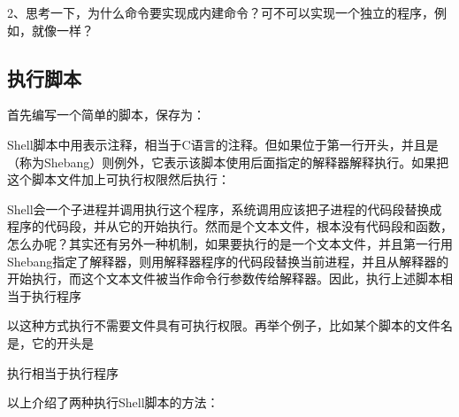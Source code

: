 2、思考一下，为什么命令要实现成内建命令？可不可以实现一个独立的程序，例如，就像一样？


\subsection{执行脚本}
%


首先编写一个简单的脚本，保存为：





Shell脚本中用\BookCode{\#}表示注释，相当于C语言的\BookCode{/\BookSplit{}/\BookSplit{}}注释。但如果\BookCode{\#}位于第一行开头，并且是\BookCode{\#!}（称为Shebang）则例外，它表示该脚本使用后面指定的解释器解释执行。如果把这个脚本文件加上可执行权限然后执行：




Shell会一个子进程并调用执行这个程序，系统调用应该把子进程的代码段替换成程序的代码段，并从它的开始执行。然而是个文本文件，根本没有代码段和函数，怎么办呢？其实还有另外一种机制，如果要执行的是一个文本文件，并且第一行用Shebang指定了解释器，则用解释器程序的代码段替换当前进程，并且从解释器的开始执行，而这个文本文件被当作命令行参数传给解释器。因此，执行上述脚本相当于执行程序




以这种方式执行不需要文件具有可执行权限。再举个例子，比如某个脚本的文件名是，它的开头是




执行相当于执行程序




以上介绍了两种执行Shell脚本的方法：




